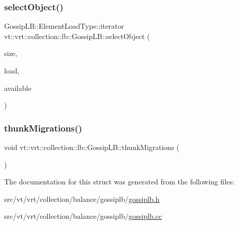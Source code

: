 \mbox{\label{structvt_1_1vrt_1_1collection_1_1lb_1_1_gossip_l_b_adafa0d7c3295e095149f48c3027b3173}} 
\subsubsection{\texorpdfstring{select\+Object()}{selectObject()}}
{\footnotesize\ttfamily Gossip\+L\+B\+::\+Element\+Load\+Type\+::iterator vt\+::vrt\+::collection\+::lb\+::\+Gossip\+L\+B\+::select\+Object (\begin{DoxyParamCaption}\item[{\hyperlink{structvt_1_1vrt_1_1collection_1_1lb_1_1_base_l_b_a215e22b9f12678303f49615ae3be05cc}{Load\+Type}}]{size,  }\item[{\hyperlink{structvt_1_1vrt_1_1collection_1_1lb_1_1_base_l_b_aa286d31a0820a8fc9218ccb858368fca}{Element\+Load\+Type} \&}]{load,  }\item[{std\+::set$<$ \hyperlink{structvt_1_1vrt_1_1collection_1_1lb_1_1_base_l_b_a15a2f756b59c8c2437985206b32aa403}{Obj\+I\+D\+Type} $>$ const \&}]{available }\end{DoxyParamCaption})\hspace{0.3cm}{\ttfamily [protected]}}

\mbox{\label{structvt_1_1vrt_1_1collection_1_1lb_1_1_gossip_l_b_a7693c8b06ab78ef3565687621d810450}} 
\subsubsection{\texorpdfstring{thunk\+Migrations()}{thunkMigrations()}}
{\footnotesize\ttfamily void vt\+::vrt\+::collection\+::lb\+::\+Gossip\+L\+B\+::thunk\+Migrations (\begin{DoxyParamCaption}{ }\end{DoxyParamCaption})\hspace{0.3cm}{\ttfamily [protected]}}



The documentation for this struct was generated from the following files\+:\begin{DoxyCompactItemize}
\item 
src/vt/vrt/collection/balance/gossiplb/\hyperlink{gossiplb_8h}{gossiplb.\+h}\item 
src/vt/vrt/collection/balance/gossiplb/\hyperlink{gossiplb_8cc}{gossiplb.\+cc}\end{DoxyCompactItemize}
